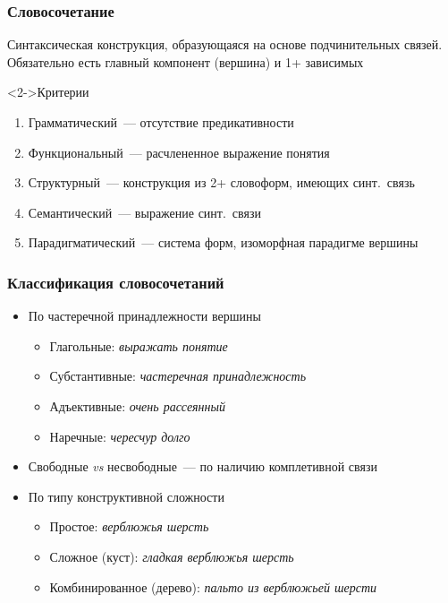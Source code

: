 \begin{frame}
  \frametitle{Словосочетание}

  Синтаксическая конструкция, образующаяся на основе подчинительных связей. Обязательно есть главный компонент (вершина) и 1+ зависимых

  \vfill

  \begin{block}<2->{Критерии}
    \begin{enumerate}
      \item Грамматический~--- отсутствие предикативности
      \item Функциональный~--- расчлененное выражение понятия
      \item Структурный~--- конструкция из 2+ словоформ, имеющих синт.\ связь
      \item Семантический~--- выражение синт.\ связи
      \item Парадигматический~--- система форм, изоморфная парадигме вершины
    \end{enumerate}
  \end{block}
\end{frame}

\begin{frame}
  \frametitle{Классификация словосочетаний}

  \begin{itemize}
    \item По частеречной принадлежности вершины \begin{itemize}
      \item Глагольные: \textit{выражать понятие}
      \item Субстантивные: \textit{частеречная принадлежность}
      \item Адъективные: \textit{очень рассеянный}
      \item Наречные: \textit{чересчур долго}
    \end{itemize}
    \item Свободные \textit{vs} несвободные~--- по наличию комплетивной связи
    \item По типу конструктивной сложности \begin{itemize}
      \item Простое: \textit{верблюжья шерсть}
      \item Сложное (куст): \textit{гладкая верблюжья шерсть}
      \item Комбинированное (дерево): \textit{пальто из верблюжьей шерсти}
    \end{itemize}
  \end{itemize}
\end{frame}

